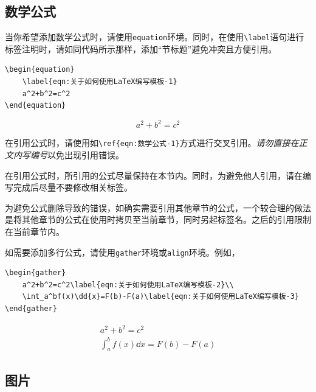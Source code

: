 \subsection{数学公式}\label{subsec:关于如何使用LaTeX编写模板-数学公式}

当你希望添加数学公式时，请使用\verb|equation|环境。同时，在使用\verb|\label|语句进行标签注明时，请如同代码所示那样，添加“节标题”避免冲突且方便引用。

\begin{lstlisting}[frame=line]
\begin{equation}
    \label{eqn:关于如何使用LaTeX编写模板-1}
    a^2+b^2=c^2
\end{equation}
\end{lstlisting}

\begin{equation}
    \label{eqn:关于如何使用LaTeX编写模板-1}
    a^2+b^2=c^2
\end{equation}

在引用公式时，请使用如\verb|\ref{eqn:数学公式-1}|方式进行交叉引用。\emph{请勿直接在正文内写编号}以免出现引用错误。

\begin{attention}
    在引用公式时，所引用的公式尽量保持在本节内。同时，为避免他人引用，请在编写完成后尽量不要修改相关标签。

    为避免公式删除导致的错误，如确实需要引用其他章节的公式，一个较合理的做法是将其他章节的公式在使用时拷贝至当前章节，同时另起标签名。之后的引用限制在当前章节内。
\end{attention}

如需要添加多行公式，请使用\verb|gather|环境或\verb|align|环境。例如，

\begin{lstlisting}[frame=line]
\begin{gather}
    a^2+b^2=c^2\label{eqn:关于如何使用LaTeX编写模板-2}\\
    \int_a^bf(x)\dd{x}=F(b)-F(a)\label{eqn:关于如何使用LaTeX编写模板-3}
\end{gather}
\end{lstlisting}

\begin{gather}
    a^2+b^2=c^2\label{eqn:关于如何使用LaTeX编写模板-2}\\
    \int_a^bf(x)\dd{x}=F(b)-F(a)\label{eqn:关于如何使用LaTeX编写模板-3}
\end{gather}

\subsection{图片}\label{subsec:关于如何使用LaTeX编写模板-图片}

